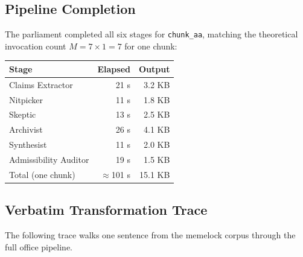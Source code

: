\documentclass[12pt, a4paper]{article}
\theoremstyle{principle}
\theoremstyle{definition}
\begin{document}
\subsection{Pipeline Completion}

The parliament completed all six stages for \texttt{chunk\_aa}, matching the
theoretical invocation count $M = 7 \times 1 = 7$ for one chunk:

\begin{center}
\begin{tabular}{lrr}
\toprule
Stage & Elapsed & Output \\
\midrule
Claims Extractor      & 21 s & 3.2 KB \\
Nitpicker             & 11 s & 1.8 KB \\
Skeptic               & 13 s & 2.5 KB \\
Archivist             & 26 s & 4.1 KB \\
Synthesist            & 11 s & 2.0 KB \\
Admissibility Auditor & 19 s & 1.5 KB \\
\midrule
Total (one chunk)     & $\approx$101 s & 15.1 KB \\
\bottomrule
\end{tabular}
\end{center}

\subsection{Verbatim Transformation Trace}

The following trace walks one sentence from the memelock corpus through the full
office pipeline.
\end{document}
